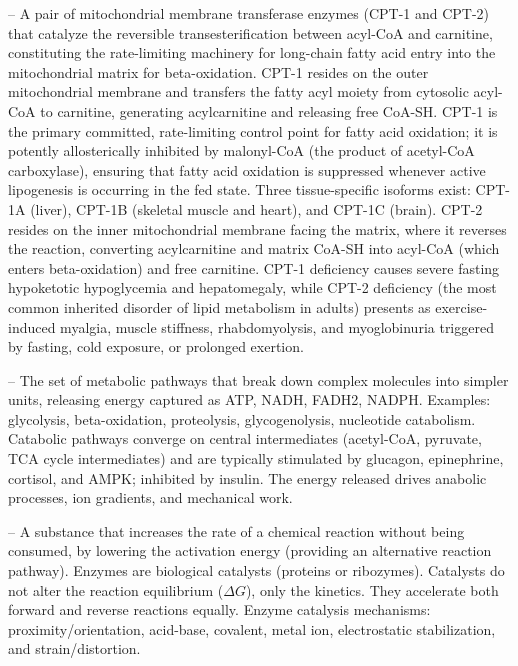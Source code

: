 -- A pair of mitochondrial membrane transferase enzymes (CPT-1 and CPT-2) that catalyze the reversible transesterification between acyl-CoA and carnitine, constituting the rate-limiting machinery for long-chain fatty acid entry into the mitochondrial matrix for beta-oxidation. CPT-1 resides on the outer mitochondrial membrane and transfers the fatty acyl moiety from cytosolic acyl-CoA to carnitine, generating acylcarnitine and releasing free CoA-SH. CPT-1 is the primary committed, rate-limiting control point for fatty acid oxidation; it is potently allosterically inhibited by malonyl-CoA (the product of acetyl-CoA carboxylase), ensuring that fatty acid oxidation is suppressed whenever active lipogenesis is occurring in the fed state. Three tissue-specific isoforms exist: CPT-1A (liver), CPT-1B (skeletal muscle and heart), and CPT-1C (brain). CPT-2 resides on the inner mitochondrial membrane facing the matrix, where it reverses the reaction, converting acylcarnitine and matrix CoA-SH into acyl-CoA (which enters beta-oxidation) and free carnitine. CPT-1 deficiency causes severe fasting hypoketotic hypoglycemia and hepatomegaly, while CPT-2 deficiency (the most common inherited disorder of lipid metabolism in adults) presents as exercise-induced myalgia, muscle stiffness, rhabdomyolysis, and myoglobinuria triggered by fasting, cold exposure, or prolonged exertion.

-- The set of metabolic pathways that break down complex molecules into simpler units, releasing energy captured as ATP, NADH, FADH2, NADPH. Examples: glycolysis, beta-oxidation, proteolysis, glycogenolysis, nucleotide catabolism. Catabolic pathways converge on central intermediates (acetyl-CoA, pyruvate, TCA cycle intermediates) and are typically stimulated by glucagon, epinephrine, cortisol, and AMPK; inhibited by insulin. The energy released drives anabolic processes, ion gradients, and mechanical work.

-- A substance that increases the rate of a chemical reaction without being consumed, by lowering the activation energy (providing an alternative reaction pathway). Enzymes are biological catalysts (proteins or ribozymes). Catalysts do not alter the reaction equilibrium ($\Delta G$), only the kinetics. They accelerate both forward and reverse reactions equally. Enzyme catalysis mechanisms: proximity/orientation, acid-base, covalent, metal ion, electrostatic stabilization, and strain/distortion.

